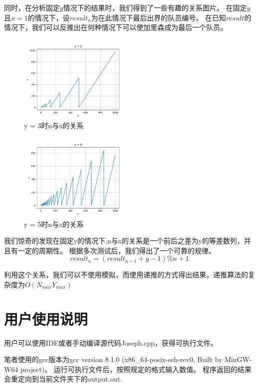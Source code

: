    同时，在分析固定$y$情况下的结果时，我们得到了一些有趣的关系图片。
   在固定$y$且$x = 1$的情况下，设$result_n$为在此情况下最后出界的队员编号。
   在已知$result$的情况下，我们可以反推出在何种情况下可以使加里森成为最后一个队员。

   \begin{figure}[H]
      \centering
      \includegraphics[width=0.5\textwidth]{images/y3.png}
      \caption{y = 3时n与x的关系}
   \end{figure}


   \begin{figure}[H]
      \centering
      \includegraphics[width=0.5\textwidth]{images/y5.png}
      \caption{y = 5时n与x的关系}
   \end{figure}


   我们惊奇的发现在固定y的情况下,n与x的关系是一个前后之差为y的等差数列，并且有一定的周期性。
   根据多次测试后，我们得出了一个可靠的规律。
   $$ result_{n} = (result_{n-1} + y - 1) \% n + 1 $$

   利用这个关系，我们可以不使用模拟，而使用递推的方式得出结果，递推算法的复杂度为$O(N_{max}Y_{max})$

\section{用户使用说明}

   用户可以使用IDE或者手动编译源代码Joseph.cpp，获得可执行文件。
   
   笔者使用的gcc版本为gcc version 8.1.0 (x86_64-posix-seh-rev0, Built by MinGW-W64 project)。
   运行可执行文件后，按照规定的格式输入数值。
   程序返回的结果会重定向到当前文件夹下的output.out.

